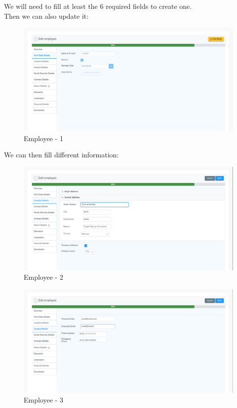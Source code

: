 \documentclass[12pt,a4paper,table,english]{article}
\begin{document}
	We will need to fill at least the 6 required fields to create one.\\
	Then we can also update it:
	
	\begin{figure}[H]
	\centering
	\includegraphics[width=150mm]{Image/employee1}
	\caption{Employee - 1}
	\label{fig:Employee - 1}
	\end{figure}

	We can then fill different information:
	
	\begin{figure}[H]
		\centering
		\includegraphics[width=150mm]{Image/employee2}
		\caption{Employee - 2}
		\label{fig:Employee - 2}
	\end{figure}
	
		
	\begin{figure}[H]
		\centering
		\includegraphics[width=150mm]{Image/employee3}
		\caption{Employee - 3}
		\label{fig:Employee - 3}
	\end{figure}
	
\end{document}
